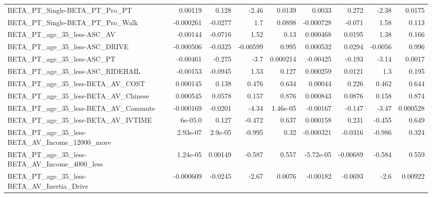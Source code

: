 \begin{tabular}{lrrrrrrrr}
BETA\_PT\_Single-BETA\_PT\_Pro\_PT                      &     0.00119 &        0.128 &    -2.46 &   0.0139 &     0.0033 &       0.272 &        -2.38 &        0.0175 \\
BETA\_PT\_Single-BETA\_PT\_Pro\_Walk                    &   -0.000261 &      -0.0277 &      1.7 &   0.0898 &  -0.000728 &      -0.071 &         1.58 &         0.113 \\
BETA\_PT\_age\_35\_less-ASC\_AV                         &    -0.00144 &      -0.0716 &     1.52 &     0.13 &   0.000468 &      0.0195 &         1.38 &         0.166 \\
BETA\_PT\_age\_35\_less-ASC\_DRIVE                      &   -0.000506 &      -0.0325 & -0.00599 &    0.995 &   0.000532 &      0.0294 &      -0.0056 &         0.996 \\
BETA\_PT\_age\_35\_less-ASC\_PT                         &    -0.00461 &       -0.275 &     -3.7 & 0.000214 &   -0.00425 &      -0.193 &        -3.14 &        0.0017 \\
BETA\_PT\_age\_35\_less-ASC\_RIDEHAIL                   &    -0.00153 &      -0.0945 &     1.53 &    0.127 &   0.000259 &      0.0121 &          1.3 &         0.195 \\
BETA\_PT\_age\_35\_less-BETA\_AV\_COST                   &    0.000145 &        0.138 &    0.476 &    0.634 &    0.00044 &       0.226 &        0.462 &         0.644 \\
BETA\_PT\_age\_35\_less-BETA\_AV\_Chinese                &    0.000545 &       0.0578 &    0.157 &    0.876 &   0.000843 &      0.0876 &        0.158 &         0.874 \\
BETA\_PT\_age\_35\_less-BETA\_AV\_Commute                &   -0.000169 &      -0.0201 &    -4.34 & 1.46e-05 &   -0.00167 &      -0.147 &        -3.47 &      0.000528 \\
BETA\_PT\_age\_35\_less-BETA\_AV\_IVTIME                 &     6e-05.0 &        0.127 &   -0.472 &    0.637 &   0.000158 &       0.231 &       -0.455 &         0.649 \\
BETA\_PT\_age\_35\_less-BETA\_AV\_Income\_12000\_more      &    2.93e-07 &      2.9e-05 &   -0.995 &     0.32 &  -0.000321 &     -0.0316 &       -0.986 &         0.324 \\
BETA\_PT\_age\_35\_less-BETA\_AV\_Income\_4000\_less       &    1.24e-05 &      0.00149 &   -0.587 &    0.557 &  -5.72e-05 &    -0.00689 &       -0.584 &         0.559 \\
BETA\_PT\_age\_35\_less-BETA\_AV\_Inertia\_Drive          &   -0.000609 &      -0.0245 &    -2.67 &   0.0076 &   -0.00182 &     -0.0693 &         -2.6 &       0.00922 \\

\end{tabular}
